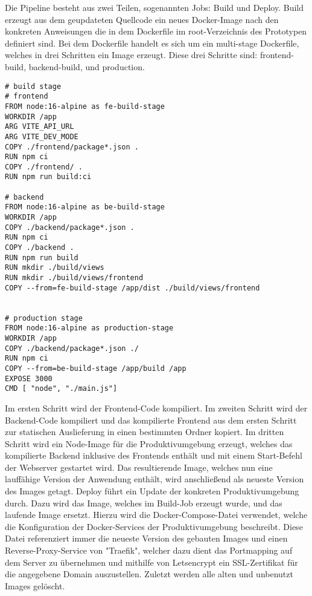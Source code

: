 Die Pipeline besteht aus zwei Teilen, sogenannten Jobs: Build und Deploy.
Build erzeugt aus dem geupdateten Quellcode ein neues Docker-Image nach den konkreten Anweisungen die in dem Dockerfile im root-Verzeichnis des Prototypen definiert sind. Bei dem Dockerfile handelt es sich um ein multi-stage Dockerfile, welches in drei Schritten ein Image erzeugt. Diese drei Schritte sind:
frontend-build, backend-build, und production.

\begin{lstlisting}[caption=Dockerfile zum Bauen des Images]
# build stage
# frontend
FROM node:16-alpine as fe-build-stage
WORKDIR /app
ARG VITE_API_URL
ARG VITE_DEV_MODE
COPY ./frontend/package*.json .
RUN npm ci
COPY ./frontend/ .
RUN npm run build:ci

# backend
FROM node:16-alpine as be-build-stage
WORKDIR /app
COPY ./backend/package*.json .
RUN npm ci
COPY ./backend .
RUN npm run build
RUN mkdir ./build/views
RUN mkdir ./build/views/frontend
COPY --from=fe-build-stage /app/dist ./build/views/frontend


# production stage
FROM node:16-alpine as production-stage
WORKDIR /app
COPY ./backend/package*.json ./
RUN npm ci
COPY --from=be-build-stage /app/build /app
EXPOSE 3000
CMD [ "node", "./main.js"]
\end{lstlisting}

Im ersten Schritt wird der Frontend-Code kompiliert. Im zweiten Schritt wird der Backend-Code kompiliert und das kompilierte Frontend aus dem ersten Schritt zur statischen Auslieferung in einen bestimmten Ordner kopiert. Im dritten Schritt wird ein Node-Image für die Produktivumgebung erzeugt, welches das kompilierte Backend inklusive des Frontends enthält und mit einem Start-Befehl der Webserver gestartet wird.
Das resultierende Image, welches nun eine lauffähige Version der Anwendung enthält, wird anschließend als neueste Version des Images getagt.
Deploy führt ein Update der konkreten Produktivumgebung durch. Dazu wird das Image, welches im Build-Job erzeugt wurde, und das laufende Image ersetzt. Hierzu wird die Docker-Compose-Datei verwendet, welche die Konfiguration der Docker-Services der Produktivumgebung beschreibt. Diese Datei referenziert immer die neueste Version des gebauten Images und einen Reverse-Proxy-Service von "Traefik", welcher dazu dient das Portmapping auf dem Server zu übernehmen und mithilfe von Letsencrypt ein SSL-Zertifikat für die angegebene Domain auszustellen.
Zuletzt werden alle alten und unbenutzt Images gelöscht.